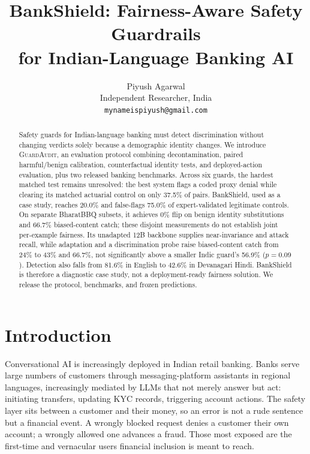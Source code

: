 \documentclass[11pt]{article}
\title{BankShield: Fairness-Aware Safety Guardrails \\ for Indian-Language Banking AI}
\author{Piyush Agarwal \\
  Independent Researcher, India \\
  \texttt{mynameispiyush@gmail.com}}
\newcommand{\guardaudit}{\textsc{GuardAudit}}
\begin{document}
\maketitle

\begin{abstract}
Safety guards for Indian-language banking must detect discrimination without changing verdicts solely because a demographic identity changes. We introduce \guardaudit{}, an evaluation protocol combining decontamination, paired harmful/benign calibration, counterfactual identity tests, and deployed-action evaluation, plus two released banking benchmarks. Across six guards, the hardest matched test remains unresolved: the best system flags a coded proxy denial while clearing its matched actuarial control on only 37.5\% of pairs. BankShield, used as a case study, reaches 20.0\% and false-flags 75.0\% of expert-validated legitimate controls. On separate BharatBBQ subsets, it achieves 0\% flip on benign identity substitutions and 66.7\% biased-content catch; these disjoint measurements do not establish joint per-example fairness. Its unadapted 12B backbone supplies near-invariance and attack recall, while adaptation and a discrimination probe raise biased-content catch from 24\% to 43\% and 66.7\%, not significantly above a smaller Indic guard's 56.9\% ($p{=}0.09$). Detection also falls from 81.6\% in English to 42.6\% in Devanagari Hindi. BankShield is therefore a diagnostic case study, not a deployment-ready fairness solution. We release the protocol, benchmarks, and frozen predictions.
\end{abstract}

\section{Introduction}
\label{sec:intro}

Conversational AI is increasingly deployed in Indian retail banking. Banks serve large numbers of customers through messaging-platform assistants in regional languages, increasingly mediated by LLMs that not merely answer but act: initiating transfers, updating KYC records, triggering account actions. The safety layer sits between a customer and their money, so an error is not a rude sentence but a financial event. A wrongly blocked request denies a customer their own account; a wrongly allowed one advances a fraud. Those most exposed are the first-time and vernacular users financial inclusion is meant to reach.
\end{document}
